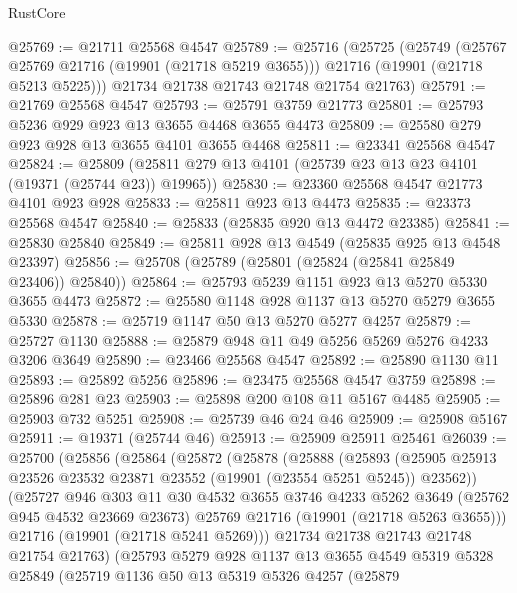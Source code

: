\begin{lexlean}{RustCore}
\begin{coremodule}
@25769 := @21711 @25568 @4547
@25789 := @25716
    (@25725
      (@25749
        (@25767 @25769 @21716 (@19901 (@21718 @5219 @3655)))
        @21716
        (@19901 (@21718 @5213 @5225)))
      @21734
      @21738
      @21743
      @21748
      @21754
      @21763)
@25791 := @21769 @25568 @4547
@25793 := @25791 @3759 @21773
@25801 := @25793 @5236 @929 @923 @13 @3655 @4468 @3655 @4473
@25809 := @25580 @279 @923 @928 @13 @3655 @4101 @3655 @4468
@25811 := @23341 @25568 @4547
@25824 := @25809 (@25811 @279 @13 @4101 (@25739 @23 @13 @23 @4101 (@19371 (@25744 @23)) @19965))
@25830 := @23360 @25568 @4547 @21773 @4101 @923 @928
@25833 := @25811 @923 @13 @4473
@25835 := @23373 @25568 @4547
@25840 := @25833 (@25835 @920 @13 @4472 @23385)
@25841 := @25830 @25840
@25849 := @25811 @928 @13 @4549 (@25835 @925 @13 @4548 @23397)
@25856 := @25708 (@25789 (@25801 (@25824 (@25841 @25849 @23406)) @25840))
@25864 := @25793 @5239 @1151 @923 @13 @5270 @5330 @3655 @4473
@25872 := @25580 @1148 @928 @1137 @13 @5270 @5279 @3655 @5330
@25878 := @25719 @1147 @50 @13 @5270 @5277 @4257
@25879 := @25727 @1130
@25888 := @25879 @948 @11 @49 @5256 @5269 @5276 @4233 @3206 @3649
@25890 := @23466 @25568 @4547
@25892 := @25890 @1130 @11
@25893 := @25892 @5256
@25896 := @23475 @25568 @4547 @3759
@25898 := @25896 @281 @23
@25903 := @25898 @200 @108 @11 @5167 @4485
@25905 := @25903 @732 @5251
@25908 := @25739 @46 @24 @46
@25909 := @25908 @5167
@25911 := @19371 (@25744 @46)
@25913 := @25909 @25911 @25461
@26039 := @25700
    (@25856
      (@25864
        (@25872
          (@25878
            (@25888
              (@25893
                (@25905 @25913 @23526 @23532 @23871 @23552 (@19901 (@23554 @5251 @5245)) @23562))
              (@25727
                @946
                @303
                @11
                @30
                @4532
                @3655
                @3746
                @4233
                @5262
                @3649
                (@25762 @945 @4532 @23669 @23673)
                @25769
                @21716
                (@19901 (@21718 @5263 @3655)))
              @21716
              (@19901 (@21718 @5241 @5269)))
            @21734
            @21738
            @21743
            @21748
            @21754
            @21763)
          (@25793
            @5279
            @928
            @1137
            @13
            @3655
            @4549
            @5319
            @5328
            @25849
            (@25719
              @1136
              @50
              @13
              @5319
              @5326
              @4257
              (@25879

\end{coremodule}
\end{lexlean}
